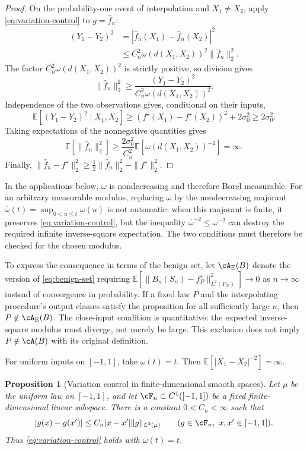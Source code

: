 \documentclass[11pt,twoside]{article}
\newcommand{\E}{\mathbb E}
\newtheorem{proposition}[theorem]{Proposition}
\theoremstyle{definition}
\theoremstyle{remark}
\begin{document}
\begin{proof}
On the probability-one event of interpolation and $X_1\ne X_2$, apply
\cref{eq:variation-control} to $g=\widehat f_n$:
\begin{align*}
 (Y_1-Y_2)^2
 &=|\widehat f_n(X_1)-\widehat f_n(X_2)|^2\\
 &\le C_n^2\omega(d(X_1,X_2))^2\|\widehat f_n\|_2^2.
\end{align*}
The factor $C_n^2\omega(d(X_1,X_2))^2$ is strictly positive, so division gives
\[
 \|\widehat f_n\|_2^2
 \ge\frac{(Y_1-Y_2)^2}{C_n^2\omega(d(X_1,X_2))^2}.
\]
Independence of the two observations gives, conditional on their inputs,
\[
 \E[(Y_1-Y_2)^2\mid X_1,X_2]
 \ge(f^\star(X_1)-f^\star(X_2))^2+2\sigma_0^2
 \ge2\sigma_0^2.
\]
Taking expectations of the nonnegative quantities gives
\[
 \E[\|\widehat f_n\|_2^2]
 \ge\frac{2\sigma_0^2}{C_n^2}
       \E[\omega(d(X_1,X_2))^{-2}]=\infty.
\]
Finally,
$\|\widehat f_n-f^\star\|_2^2
 \ge\frac12\|\widehat f_n\|_2^2-\|f^\star\|_2^2$.
\end{proof}

In the applications below, $\omega$ is nondecreasing and therefore Borel
measurable. For an arbitrary measurable modulus, replacing $\omega$ by the
nondecreasing majorant
$\overline\omega(t)=\sup_{0<u\le t}\omega(u)$ is not automatic: when this
majorant is finite, it preserves \cref{eq:variation-control}, but the inequality
$\overline\omega^{-2}\le\omega^{-2}$ can destroy the required infinite
inverse-square expectation. The two conditions must therefore be checked for
the chosen modulus.

To express the consequence in terms of the benign set, let $\cA_{\rm E}(B)$
denote the version of \cref{eq:benign-set} requiring
$\E[\|B_n(S_n)-f_P^\star\|_{L^2(P_X)}^2]\to0$ as $n\to\infty$ instead of convergence in
probability. If a fixed law $P$ and the interpolating procedure's output
classes satisfy the proposition for all sufficiently large $n$, then
$P\notin\cA_{\rm E}(B)$. The close-input condition is quantitative:
the expected inverse-square modulus must diverge, not merely be large.
This exclusion does not imply $P\notin\cA(B)$ with its original definition.

For uniform inputs on $[-1,1]$, take $\omega(t)=t$. Then
$\E[|X_1-X_2|^{-2}]=\infty$.

\begin{proposition}[Variation control in finite-dimensional smooth spaces]
\label{prop:finite-dimensional-variation}
Let $\mu$ be the uniform law on $[-1,1]$, and let
$\cF_n\subset C^1([-1,1])$ be a fixed finite-dimensional linear subspace.
There is a constant $0<C_n<\infty$ such that
\[
 |g(x)-g(x')|
 \le C_n|x-x'|\|g\|_{L^2(\mu)}
 \qquad(g\in\cF_n,\ x,x'\in[-1,1]).
\]
Thus \cref{eq:variation-control} holds with $\omega(t)=t$.
\end{proposition}
\end{document}
